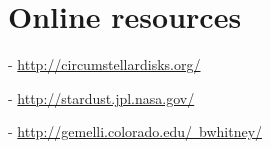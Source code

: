 \documentclass[11pt]{book}
\begin{document}

\appendix

%

%

%

%

%

%

\backmatter


\pagestyle{empty}

\chapter{Online resources}

\begin{footnotesize}

\noindent [1] - \href{http://circumstellardisks.org/}{http://circumstellardisks.org/}

\noindent [2] - \href{http://stardust.jpl.nasa.gov/}{http://stardust.jpl.nasa.gov/}

\noindent [3] - \href{http://gemelli.colorado.edu/~bwhitney/}{http://gemelli.colorado.edu/~bwhitney/}

\end{footnotesize}


\newpage

\ \\

\newpage


\end{document}
